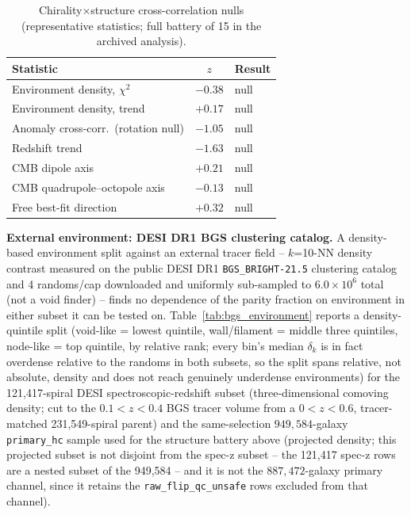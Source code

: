 \documentclass[twocolumn,linenumbers]{aastex702}
\begin{document}
\begin{table}[t]
\centering
\caption{Chirality$\times$structure cross-correlation nulls (representative
statistics; full battery of 15 in the archived analysis).}
\label{tab:structure_null}
\begin{ruledtabular}
\begin{tabular}{lcl}
Statistic & $z$ & Result \\
\hline
Environment density, $\chi^2$ & $-0.38$ & null \\
Environment density, trend & $+0.17$ & null \\
Anomaly cross-corr.\ (rotation null) & $-1.05$ & null \\
Redshift trend & $-1.63$ & null \\
CMB dipole axis & $+0.21$ & null \\
CMB quadrupole--octopole axis & $-0.13$ & null \\
Free best-fit direction & $+0.32$ & null \\
\end{tabular}
\end{ruledtabular}
\end{table}

\textbf{External environment: DESI DR1 BGS clustering catalog.} A
density-based environment split against an external tracer field --
$k$=10-NN density contrast measured on the public DESI DR1
\texttt{BGS\_BRIGHT-21.5} clustering catalog and 4 randoms/cap downloaded
and uniformly sub-sampled to $6.0\times10^6$ total (not a void finder) --
finds no dependence of the parity fraction on environment in either subset
it can be tested on. Table~\ref{tab:bgs_environment} reports a
density-quintile split (void-like = lowest quintile, wall/filament =
middle three quintiles, node-like = top quintile, by relative rank; every
bin's median $\delta_k$ is in fact overdense relative to the randoms in
both subsets, so the split spans relative, not absolute, density and does
not reach genuinely underdense environments)
for the 121,417-spiral DESI spectroscopic-redshift subset (three-dimensional
comoving density; cut to the $0.1<z<0.4$ BGS tracer volume from a
$0<z<0.6$, tracer-matched 231,549-spiral parent) and the same-selection
$949{,}584$-galaxy \texttt{primary\_hc}
sample used for the structure battery above (projected density; this
projected subset is not disjoint from the spec-z subset -- the 121,417
spec-z rows are a nested subset of the 949,584 -- and it is not the
$887{,}472$-galaxy primary channel, since it retains the
\texttt{raw\_flip\_qc\_unsafe} rows excluded from that channel).
\end{document}
